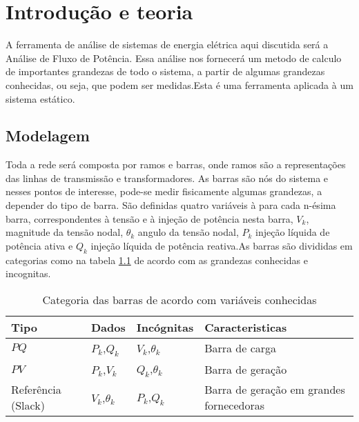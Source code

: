 \chapter{Introdu\c{c}\~ao e teoria}





A ferramenta de an\'alise de sistemas de energia el\'etrica aqui discutida ser\'a a An\'alise de Fluxo de Pot\^encia. Essa an\'alise nos fornecer\'a um metodo de calculo de importantes grandezas de todo o sistema, a partir de algumas grandezas conhecidas, ou seja, que podem ser medidas.Esta \'e uma ferramenta aplicada \`a um sistema est\'atico.
\section{Modelagem}
\label{SectionIntro}
Toda a rede ser\'a composta por ramos e barras, onde ramos s\~ao a representa\c{c}\~oes das linhas de transmiss\~ao e transformadores. As barras s\~ao n\'os do sistema e nesses pontos de interesse, pode-se medir fisicamente algumas grandezas, a depender do tipo de barra. S\~ao definidas quatro vari\'aveis \`a para cada n-ésima barra, correspondentes \`a tens\~ao e \`a inje\c{c}\~ao de
pot\^encia nesta barra, $V_k$, magnitude da tens\~ao nodal, $\theta_k$ angulo da tens\~ao nodal, $P_k$ inje\c{c}\~ao l\'iquida de pot\^encia ativa e $Q_k$ inje\c{c}\~ao l\'iquida de pot\^encia reativa.As barras s\~ao divididas em categorias como na tabela \ref{t_PQPVSlack} de acordo com as grandezas conhecidas e incognitas.
\begin{table}[]
\caption{Categoria das barras de acordo com variáveis conhecidas}
\begin{tabular}{@{}llll@{}}
\toprule
Tipo & Dados & Incógnitas & Caracteristicas \\ 
\midrule
$PQ$ & $P_k$,$Q_k$ & $V_k$,$\theta_k$  & Barra de carga \\
$PV$ & $P_k$,$V_k$ & $Q_k$,$\theta_k$  & Barra de geração\\
Referência (Slack) & $V_k$,$\theta_k$ & $P_k$,$Q_k$& Barra de geração em grandes fornecedoras \\ \bottomrule
\end{tabular}
\label{t_PQPVSlack}
\end{table}



